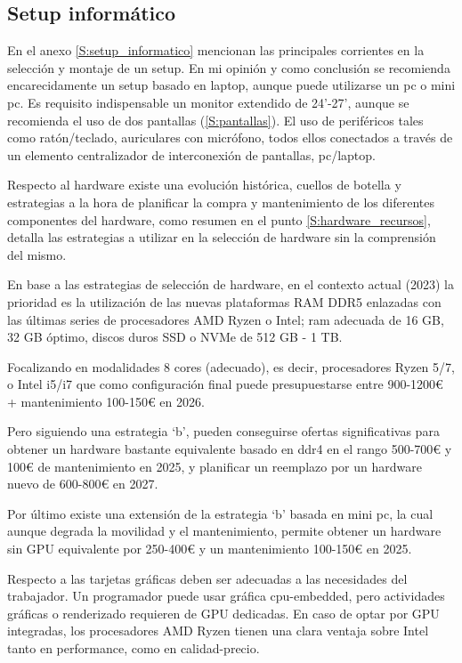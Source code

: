 \subsection{Setup informático}
En el anexo \ref{S:setup_informatico} mencionan las principales corrientes en la selección y montaje de un setup. En mi opinión y como conclusión se recomienda encarecidamente un setup basado en laptop, aunque puede utilizarse un pc o mini pc. Es requisito indispensable un monitor extendido de 24’-27’, aunque se recomienda el uso de dos pantallas (\ref{S:pantallas}). El uso de periféricos tales como ratón/teclado, auriculares con micrófono, todos ellos conectados a través de un elemento centralizador de interconexión de pantallas, pc/laptop.

Respecto al hardware existe una evolución histórica\cite{c_guia_hardware}, cuellos de botella y estrategias a la hora de planificar la compra y mantenimiento de los diferentes componentes del  hardware, como resumen en el punto \ref{S:hardware_recursos}, detalla las estrategias a utilizar en la selección de hardware sin la comprensión del mismo.

 En base a las estrategias de selección de hardware, en el contexto actual (2023) la prioridad es la utilización de las nuevas plataformas RAM DDR5 enlazadas con las últimas series de procesadores AMD Ryzen o Intel; ram adecuada de 16 GB, 32 GB óptimo, discos duros SSD o NVMe de 512 GB - 1 TB.

Focalizando en modalidades 8 cores (adecuado), es decir, procesadores Ryzen 5/7, o Intel i5/i7 que como configuración final puede presupuestarse entre 900-1200€ + mantenimiento 100-150€ en 2026.

Pero siguiendo una estrategia ‘b’, pueden conseguirse ofertas significativas para obtener un hardware bastante equivalente basado en ddr4 en el rango 500-700€ y 100€ de mantenimiento en 2025, y planificar un reemplazo por un hardware nuevo de  600-800€ en 2027.

Por último existe una extensión de la estrategia ‘b’ basada en mini pc, la cual aunque degrada la movilidad y el mantenimiento, permite obtener un hardware sin GPU equivalente por 250-400€ y un mantenimiento 100-150€ en 2025.

 Respecto a las tarjetas gráficas deben ser adecuadas a las necesidades del trabajador. Un programador puede usar gráfica cpu-embedded, pero actividades gráficas o renderizado requieren de GPU dedicadas. En caso de optar por GPU integradas, los procesadores AMD Ryzen tienen una clara ventaja sobre Intel tanto en performance, como en calidad-precio.

